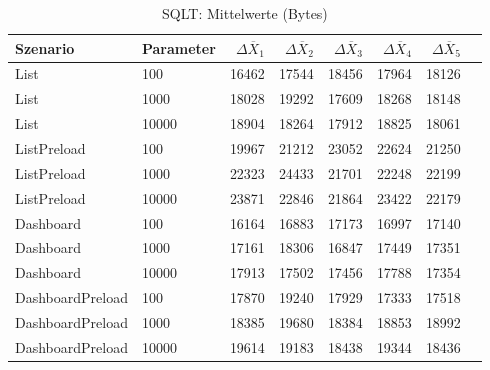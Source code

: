 
\begin{table}[ht]
\setlength{\extrarowheight}{-1pt}
\centering
\caption{SQLT: Mittelwerte (Bytes)}
\begin{tabular}{llrrrrrr}
\toprule
Szenario & Parameter & ${\Delta \overline{X}_1}$ & ${\Delta \overline{X}_2}$ & ${\Delta \overline{X}_3}$ & ${\Delta \overline{X}_4}$ & ${\Delta \overline{X}_5}$ \\
\midrule
	List & 100 & 16462 & 17544 & 18456 & 17964 & 18126 \\
	List & 1000 & 18028 & 19292 & 17609 & 18268 & 18148 \\
	List & 10000 & 18904 & 18264 & 17912 & 18825 & 18061 \\
	ListPreload & 100 & 19967 & 21212 & 23052 & 22624 & 21250 \\
	ListPreload & 1000 & 22323 & 24433 & 21701 & 22248 & 22199 \\
	ListPreload & 10000 & 23871 & 22846 & 21864 & 23422 & 22179 \\
	Dashboard & 100 & 16164 & 16883 & 17173 & 16997 & 17140 \\
	Dashboard & 1000 & 17161 & 18306 & 16847 & 17449 & 17351 \\
	Dashboard & 10000 & 17913 & 17502 & 17456 & 17788 & 17354 \\
	DashboardPreload & 100 & 17870 & 19240 & 17929 & 17333 & 17518 \\
	DashboardPreload & 1000 & 18385 & 19680 & 18384 & 18853 & 18992 \\
	DashboardPreload & 10000 & 19614 & 19183 & 18438 & 19344 & 18436 \\
\bottomrule
\end{tabular}
\label{tab:mittelwerte_sqlt_bytes}
\end{table}
	